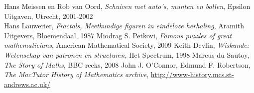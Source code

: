 
\begin{thebibliography}{1}
\label{1} Hans Meissen en Rob van Oord, \textit{Schuiven met auto's, munten en bollen}, Epsilon Uitgaven, Utrecht, 2001-2002\\
\label{2} Hans Lauwerier, \textit{Fractals, Meetkundige figuren in eindeloze herhaling}, Aramith Uitgevers, Bloemendaal, 1987
\label{3} Miodrag S. Petkovi, \textit{Famous puzzles of great mathematicians}, American Mathematical Society, 2009
\label{4} Keith Devlin, \textit{Wiskunde: Wetenschap van patronen en structuren}, Het Spectrum, 1998
\label{5} Marcus du Sautoy, \textit{The Story of Maths}, BBC reeks, 2008
\label{2} John J. O'Connor, Edmund F. Robertson, \textit{The MacTutor History of Mathematics archive}, \url{http://www-history.mcs.st-andrews.ac.uk/}
\end{thebibliography}

